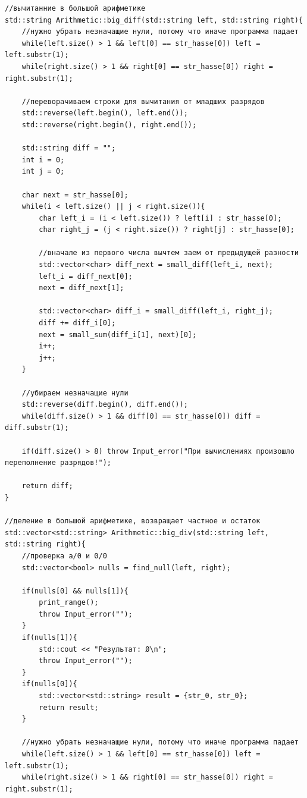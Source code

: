 \begin{lstlisting}[caption=big\_diff и big\_div, label=lst:big-diff и big-div]
//вычитанние в большой арифметике
std::string Arithmetic::big_diff(std::string left, std::string right){
    //нужно убрать незначащие нули, потому что иначе программа падает
    while(left.size() > 1 && left[0] == str_hasse[0]) left = left.substr(1);
    while(right.size() > 1 && right[0] == str_hasse[0]) right = right.substr(1);

    //переворачиваем строки для вычитания от младших разрядов
    std::reverse(left.begin(), left.end());
    std::reverse(right.begin(), right.end());

    std::string diff = "";
    int i = 0;
    int j = 0;

    char next = str_hasse[0];
    while(i < left.size() || j < right.size()){
        char left_i = (i < left.size()) ? left[i] : str_hasse[0];
        char right_j = (j < right.size()) ? right[j] : str_hasse[0];

        //вначале из первого числа вычтем заем от предыдущей разности
        std::vector<char> diff_next = small_diff(left_i, next);
        left_i = diff_next[0];
        next = diff_next[1];

        std::vector<char> diff_i = small_diff(left_i, right_j);
        diff += diff_i[0];
        next = small_sum(diff_i[1], next)[0];
        i++;
        j++;
    }

    //убираем незначащие нули
    std::reverse(diff.begin(), diff.end());
    while(diff.size() > 1 && diff[0] == str_hasse[0]) diff = diff.substr(1);

    if(diff.size() > 8) throw Input_error("При вычислениях произошло переполнение разрядов!");

    return diff;
}

//деление в большой арифметике, возвращает частное и остаток
std::vector<std::string> Arithmetic::big_div(std::string left, std::string right){
    //проверка a/0 и 0/0
    std::vector<bool> nulls = find_null(left, right);

    if(nulls[0] && nulls[1]){
        print_range();
        throw Input_error("");
    }
    if(nulls[1]){
        std::cout << "Результат: Ø\n";
        throw Input_error("");
    }
    if(nulls[0]){
        std::vector<std::string> result = {str_0, str_0};
        return result;
    }

    //нужно убрать незначащие нули, потому что иначе программа падает
    while(left.size() > 1 && left[0] == str_hasse[0]) left = left.substr(1);
    while(right.size() > 1 && right[0] == str_hasse[0]) right = right.substr(1);
    

\end{lstlisting}
